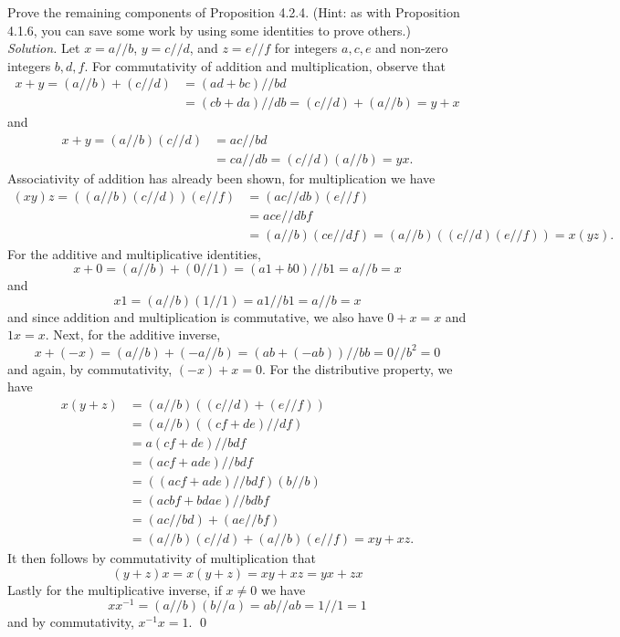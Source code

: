 \documentclass{amsart}
\theoremstyle{definition}
\newcommand{\soln}{\newline\textit{Solution.} }
\begin{document}
\subsubsection{} Prove the remaining components of Proposition 4.2.4. (Hint: as with Proposition 4.1.6, you can save some work by using some identities to prove others.) \\
\soln Let $x=a//b$, $y=c//d$, and $z=e//f$ for integers $a,c,e$ and non-zero integers $b,d,f$. For commutativity of addition and multiplication, observe that
\begin{align*}
x+y=(a//b)+(c//d)&=(ad+bc)//bd\\
&=(cb+da)//db=(c//d)+(a//b)=y+x
\end{align*}
and 
\begin{align*}
x+y=(a//b)(c//d)&=ac//bd\\
&=ca//db=(c//d)(a//b)=yx.
\end{align*}
Associativity of addition has already been shown, for multiplication we have
\begin{align*}
(xy)z=((a//b)(c//d))(e//f)&=(ac//db)(e//f) \\
&=ace//dbf \\
&=(a//b)(ce//df) 
=(a//b)((c//d)(e//f))=x(yz).
\end{align*}
For the additive and multiplicative identities, 
\[
x+0=(a//b)+(0//1)=(a1+b0)//b1=a//b=x
\]
and 
\[
x1=(a//b)(1//1)=a1//b1=a//b=x
\]
and since addition and multiplication is commutative, we also have $0+x=x$ and $1x=x$. Next, for the additive inverse, 
\[
x+(-x)=(a//b)+(-a//b)=(ab+(-ab))//bb=0//b^2=0
\]
and again, by commutativity, $(-x)+x=0$. For the distributive property, we have
\begin{align*}
x(y+z)&=(a//b)((c//d)+(e//f)) \\
&=(a//b)((cf+de)//df) \\
&=a(cf+de)//bdf \\
&=(acf+ade)//bdf \\
&=((acf+ade)//bdf)(b//b) \\
&=(acbf+bdae)//bdbf \\
&=(ac//bd)+(ae//bf) \\
&=(a//b)(c//d)+(a//b)(e//f)=xy+xz.
\end{align*}
It then follows by commutativity of multiplication that
\[
(y+z)x=x(y+z)=xy+xz=yx+zx
\]
Lastly for the multiplicative inverse, if $x\neq 0$ we have
\[
xx^{-1}=(a//b)(b//a)=ab//ab=1//1=1
\]
and by commutativity, $x^{-1}x=1$. \qed \\
\end{document}
